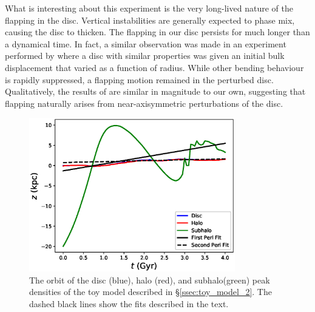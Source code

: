 What is interesting about this experiment is the very long-lived nature of the flapping in the disc. Vertical instabilities are generally expected to phase mix, causing the disc to thicken. The flapping in our disc persists for much longer than a dynamical time. In fact, a similar observation was made in an experiment performed by \citet{sellwood_1996} where a disc with similar properties was given an initial bulk displacement that varied as a function of radius. While other bending behaviour is rapidly suppressed, a flapping motion remained in the perturbed disc. Qualitatively, the results of \citet{sellwood_1996} are similar in magnitude to our own, suggesting that flapping naturally arises from near-axisymmetric perturbations of the disc.

\begin{figure}
	\centering
	\includegraphics[width=0.8\textwidth]{../figures/isolated_orbits_two_fits.eps}
	\caption{The orbit of the disc (blue), halo (red), and subhalo(green) peak densities of the toy model described in \S\ref{ssec:toy_model_2}. The dashed black lines show the fits described in the text.} \label{fig:toy_model_2_orbits}
\end{figure}





